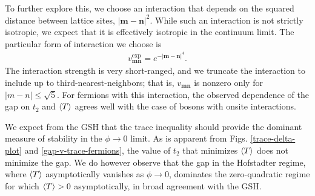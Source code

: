 \documentclass[aps,prb,twocolumn,letterpaper,twoside,nobalancelastpage,groupedaddress,amsmath,amssymb,floatfix,citeautoscript]{revtex4-1}
\begin{document}
To further explore this, we choose an interaction that depends on the squared distance between lattice sites, $|\mathbf{m} - \mathbf{n}|^2$. While such an interaction is not strictly isotropic, we expect that it is effectively isotropic in the continuum limit. The particular form of interaction we choose is
\begin{align}
\label{exp-potential}
v_{\mathbf{m}\mathbf{n}}^{\text{exp}} = e^{-|\mathbf{m} - \mathbf{n}|^4}.
\end{align}
The interaction strength is very short-ranged, and we truncate the interaction to include up to third-nearest-neighbors; that is, $v_{\mathbf{m}\mathbf{n}}$ is nonzero only for $|m-n| \leq \sqrt{5}$. For fermions with this interaction, the observed dependence of the gap on $t_2$ and $\expval{T}$ agrees well with the case of bosons with onsite interactions.

 We expect from the GSH that the trace inequality should provide the dominant measure of stability in the $\phi \rightarrow 0$ limit. As is apparent from Figs. \ref{trace-delta-plot} and \ref{gap-v-trace-fermions}, the value of $t_2$ that minimizes $\expval{T}$ does not minimize the gap. We do however observe that the gap in the Hofstadter regime, where $\expval{T}$ asymptotically vanishes as $\phi\rightarrow 0$, dominates the zero-quadratic regime for which $\expval{T} > 0$ asymptotically, in broad agreement with the GSH. 


\end{document}
